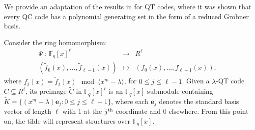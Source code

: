 \documentclass[11pt]{amsart}
\theoremstyle{plain}
\theoremstyle{definition}
\numberwithin{equation}{section}
\newcommand{\Fq}{\mathbb{F}_{q}}
\begin{document}
We provide an adaptation of the results in \cite{LF} for QT codes, where it was shown that every QC code has a polynomial generating set in the form of a reduced Gr{\"o}bner basis. 

Consider the ring homomorphism:
\begin{eqnarray}\label{embedding}
\Psi \ :\ \Fq[x]^{\ell} &\longrightarrow& R^{\ell} \\\nonumber
(\widetilde{f}_0(x), \ldots ,\widetilde{f}_{\ell-1}(x))  &\longmapsto & 
(f_0(x), \ldots ,f_{\ell-1}(x)),
\end{eqnarray}
where $f_j(x)=\widetilde{f}_j(x) \mod \langle x^m-\lambda \rangle$, for $0\leq j \leq \ell-1$. Given a $\lambda$-QT code $C\subseteq R^{\ell}$, its preimage $\widetilde{C}$ in $\Fq[x]^{\ell}$ is an $\Fq[x]$-submodule containing $\widetilde{K} =\{(x^m-\lambda)\mathbf{e}_j : 0\leq j \leq \ell-1\}$, where each $\mathbf{e}_j$ denotes the standard basis vector of length $\ell$ with $1$ at the $j^{\rm th}$ coordinate and $0$ elsewhere. From this point on, the tilde will represent structures over $\Fq[x]$.
\end{document}
